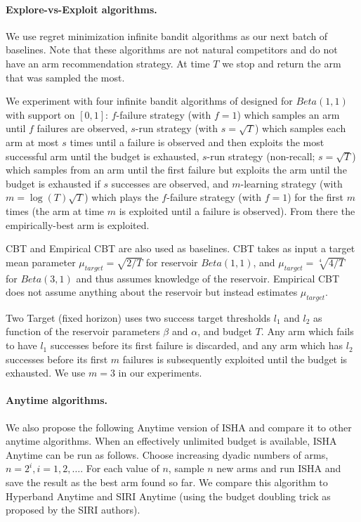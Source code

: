 \paragraph{Explore-vs-Exploit algorithms.}
We use regret minimization infinite bandit algorithms
as our next batch of baselines.
Note that these algorithms are not natural competitors and do not have an arm recommendation strategy. At time $T$ we stop and return the arm that was sampled the most.

We  experiment with four infinite bandit algorithms of \cite{berry1997} designed for $Beta(1,1)$ with support on $[0,1]$:
$f$-failure strategy (with $f=1$) which samples an arm until
$f$ failures are observed,
$s$-run strategy (with $s=\sqrt{T}$) which samples each arm
at most $s$ times until a failure is observed and then exploits the most
successful arm until the budget is exhausted,
$s$-run strategy (non-recall; $s=\sqrt{T}$) which samples from
an arm until the first failure but exploits the arm until the budget
is exhausted if $s$ successes are observed, and
$m$-learning strategy (with $m=\log(T)\sqrt{T}$) which plays the $f$-failure strategy (with $f=1$) for the first $m$
times (the arm at time $m$ is exploited until a failure is observed). From there the empirically-best arm is exploited. 

CBT and Empirical CBT  
\cite{Chan2018Infinite} are also used as baselines.
CBT takes as input a target mean parameter $\mu_{target}=\sqrt{2/T}$ for reservoir $Beta(1,1)$, and $\mu_{target}=\sqrt[4]{4/T}$ for $Beta(3,1)$  and thus assumes
knowledge of the reservoir.
Empirical CBT does not assume anything about the reservoir but
instead estimates $\mu_{target}$. 

Two Target (fixed horizon) \cite{bonald2013two} uses
two success target thresholds
$l_1$ and $l_2$ as function of the reservoir parameters $\beta$ and $\alpha$, and budget $T$.
Any arm which fails to have $l_1$ 
successes before its first failure is discarded,
and any arm which has $l_2$ successes before its first $m$ failures
is subsequently exploited until the budget is exhausted.
We use $m=3$ in our experiments.  


\paragraph{Anytime algorithms.}
We also propose the following Anytime version
of ISHA and compare it to other anytime algorithms.
When an effectively unlimited budget is available, ISHA
Anytime can be run as follows.
Choose increasing dyadic numbers of arms, $n=2^i, i=1,2,\dots$.
For each value of $n$, sample $n$ new arms and
run ISHA and save the result
as the best arm found so far.
We compare this algorithm to Hyperband Anytime and SIRI Anytime (using the budget doubling trick as proposed by the SIRI authors).

